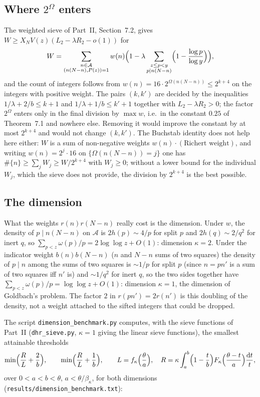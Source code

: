 \documentclass[11pt]{amsart}
\theoremstyle{remark}
\newcommand{\cA}{\mathcal{A}}
\newcommand{\dd}{\mathrm{d}}
\begin{document}
\subsection{Where $2^{\Omega}$ enters}\label{subsec:omega}
The weighted sieve of Part~II, Section~7.2, gives $W\ge X_NV(z)(L_2-\lambda R_2-o(1))$ for
\[
W=\sum_{\substack{n\in\cA\\ (n(N-n),P(z))=1}}w(n)\Bigl(1-\lambda\sum_{\substack{z\le p<y\\ p\mid n(N-n)}}\Bigl(1-\frac{\log p}{\log y}\Bigr)\Bigr),
\]
and the count of integers follows from $w(n)=16\cdot2^{\Omega(n(N-n))}\le2^{k+4}$ on the integers with positive weight. The pairs $(k,k')$ are decided by the inequalities $1/\lambda+2/b\le k+1$ and $1/\lambda+1/b\le k'+1$ together with $L_2-\lambda R_2>0$; the factor $2^{\Omega}$ enters only in the final division by $\max w$, i.e.\ in the constant $0.25$ of Theorem~7.1 and nowhere else. Removing it would improve the constant by at most $2^{k+4}$ and would not change $(k,k')$. The Buchstab identity does not help here either: $W$ is a sum of non-negative weights $w(n)\cdot(\text{Richert weight})$, and writing $w(n)=2^{j}\cdot16$ on $\{\Omega(n(N-n))=j\}$ one has $\#\{n\}\ge\sum_jW_j\ge W/2^{k+4}$ with $W_j\ge0$; without a lower bound for the individual $W_j$, which the sieve does not provide, the division by $2^{k+4}$ is the best possible.

\subsection{The dimension}\label{subsec:dim}
What the weights $r(n)r(N-n)$ really cost is the dimension. Under $w$, the density of $p\mid n(N-n)$ on $\cA$ is $2h(p)\sim4/p$ for split $p$ and $2h(q)\sim2/q^2$ for inert $q$, so $\sum_{p<z}\omega(p)/p=2\log\log z+O(1)$: dimension $\kappa=2$. Under the indicator weight $b(n)b(N-n)$ ($n$ and $N-n$ sums of two squares) the density of $p\mid n$ among the sums of two squares is $\sim1/p$ for split $p$ (since $n=pn'$ is a sum of two squares iff $n'$ is) and $\sim1/q^2$ for inert $q$, so the two sides together have $\sum_{p<z}\omega(p)/p=\log\log z+O(1)$: dimension $\kappa=1$, the dimension of Goldbach's problem. The factor $2$ in $r(pn')=2r(n')$ is this doubling of the density, not a weight attached to the sifted integers that could be dropped.

The script \texttt{dimension\_benchmark.py} computes, with the sieve functions of Part~II (\texttt{dhr\_sieve.py}, $\kappa=1$ giving the linear sieve functions), the smallest attainable thresholds
\[
\min\Bigl(\frac RL+\frac2b\Bigr),\qquad\min\Bigl(\frac RL+\frac1b\Bigr),\qquad L=f_\kappa\Bigl(\frac\theta a\Bigr),\quad R=\kappa\int_a^b\Bigl(1-\frac tb\Bigr)F_\kappa\Bigl(\frac{\theta-t}a\Bigr)\frac{\dd t}t,
\]
over $0<a<b<\theta$, $a<\theta/\beta_\kappa$, for both dimensions (\texttt{results/dimension\_benchmark.txt}):
\end{document}
